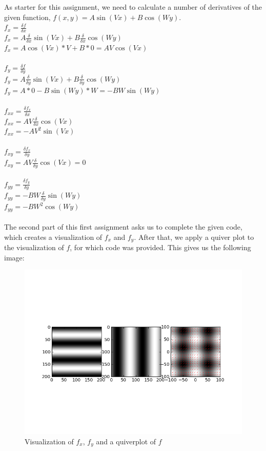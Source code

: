 \documentclass[10pt,a4paper]{article}
\begin{document}
As starter for this assignment, we need to calculate a number of
derivatives of the given function, $f(x,y) = A\sin(Vx) + B\cos(Wy)$.\\
$f_{x} = \frac{\delta f}{\delta x}$\\
$f_x = A\frac{\delta}{\delta x} \sin(Vx) + B\frac{\delta}{\delta x} \cos(Wy)$\\
$f_x = A\cos(Vx) * V + B * 0 = AV\cos(Vx)$\\
\\
$f_{y} = \frac{\delta f}{\delta y}$\\
$f_y = A \frac{\delta}{\delta y}\sin(Vx) + B \frac{\delta}{\delta y}\cos(Wy)$ \\
$f_y = A * 0 - B\sin(Wy) * W = -BW\sin(Wy)$ \\
\\
$f_{xx} = \frac{\delta f_x}{\delta x}$\\
$f_{xx} = AV \frac{\delta}{\delta x}\cos(Vx)$ \\
$f_{xx} = -AV^2\sin(Vx)$\\
\\
$f_{xy} = \frac{\delta f_x}{\delta y}$ \\
$f_{xy} = AV \frac{\delta}{\delta y}\cos(Vx) = 0$ \\
\\
$f_{yy} = \frac{\delta f_y}{\delta y}$ \\
$f_{yy} = -BW \frac{\delta}{\delta y}\sin(Wy)$ \\
$f_{yy} = -BW^2\cos(Wy)$ \\
\\
The second part of this first assignment asks us to complete the
given code, which creates a visualization of $f_x$ and $f_y$.
After that, we apply a quiver plot to the visualization of $f$, for
which code was provided. This gives us the following image:
\begin{figure}[H]
	\includegraphics[scale=0.6]{quiver.png}
	\caption{Visualization of $f_x$, $f_y$ and a quiverplot of $f$}
\end{figure}
\end{document}
